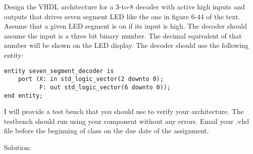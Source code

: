 Design the VHDL architecture for a 3-to-8 decoder with active high inputs and outputs that drives seven segment LED like the one in figure 6-44 of the text.  Assume that a given LED segment is on if its input is high.  The decoder should assume the input is a three bit binary number.  The decimal equivalent of that number will be shown on the LED display.  The decoder should use the following entity:
\begin{verbatim}
entity seven_segment_decoder is
    port (X: in std_logic_vector(2 downto 0);
          F: out std_logic_vector(6 downto 0));
end entity;
\end{verbatim}
I will provide a test bench that you should use to verify your architecture.  The testbench should run using your component without any errors.  Email your .vhd file before the beginning of class on the due date of the assignment.

Solution: \\ \\
\lstset{language=VHDL}

